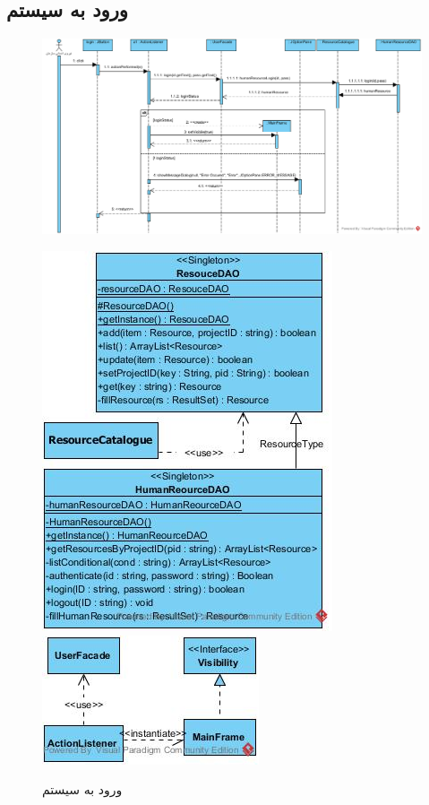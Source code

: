 \begin{landscape}
\section{ورود به سیستم}
\begin{figure}[H]
	\centering
	\includegraphics[scale=0.65]{img/sequence-design/SignIn}
\end{figure}
\begin{figure}[H]
	\centering
	\includegraphics[scale=0.6]{img/sequence-design/SignInC}
	\includegraphics[scale=0.6]{img/sequence-design/SignInUI}
	\caption{ورود به سیستم}
\end{figure}
\end{landscape}
